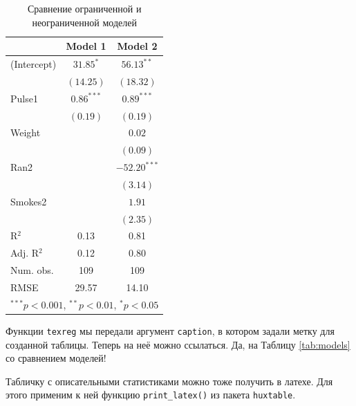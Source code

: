 \documentclass[11pt,russian,]{article}
\begin{document}
\begin{table}
\begin{center}
\begin{tabular}{l c c }
\hline
 & Model 1 & Model 2 \\
\hline
(Intercept) & $31.85^{*}$  & $56.13^{**}$   \\
            & $(14.25)$    & $(18.32)$      \\
Pulse1      & $0.86^{***}$ & $0.89^{***}$   \\
            & $(0.19)$     & $(0.19)$       \\
Weight      &              & $0.02$         \\
            &              & $(0.09)$       \\
Ran2        &              & $-52.20^{***}$ \\
            &              & $(3.14)$       \\
Smokes2     &              & $1.91$         \\
            &              & $(2.35)$       \\
\hline
R$^2$       & 0.13         & 0.81           \\
Adj. R$^2$  & 0.12         & 0.80           \\
Num. obs.   & 109          & 109            \\
RMSE        & 29.57        & 14.10          \\
\hline
\multicolumn{3}{l}{\scriptsize{$^{***}p<0.001$, $^{**}p<0.01$, $^*p<0.05$}}
\end{tabular}
\caption{\label{tab:models} Сравнение ограниченной и неограниченной моделей}
\label{table:coefficients}
\end{center}
\end{table}

Функции \texttt{texreg} мы передали аргумент \texttt{caption}, в котором
задали метку для созданной таблицы. Теперь на неё можно ссылаться. Да,
на Таблицу \ref{tab:models} со сравнением моделей!

Табличку с описательными статистиками можно тоже получить в латехе. Для
этого применим к ней функцию \texttt{print\_latex()} из пакета
\texttt{huxtable}.
\end{document}
